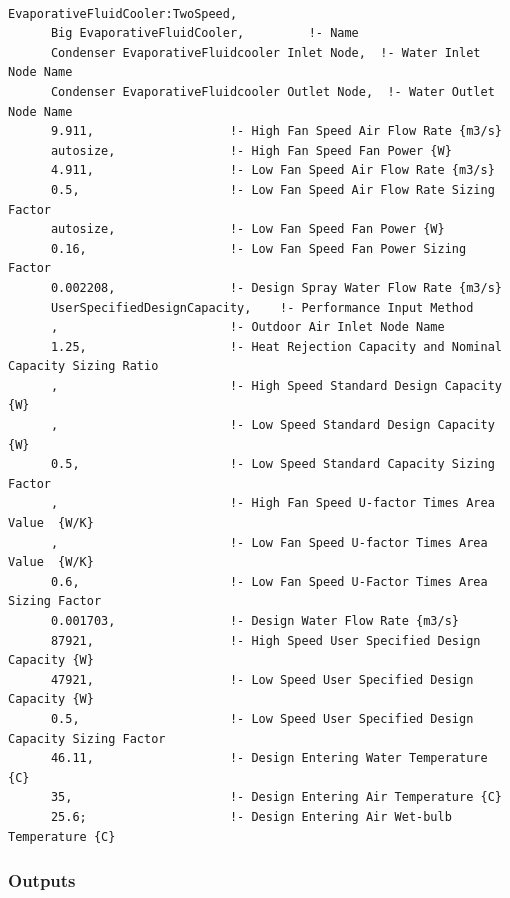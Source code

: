 \begin{lstlisting}

EvaporativeFluidCooler:TwoSpeed,
      Big EvaporativeFluidCooler,         !- Name
      Condenser EvaporativeFluidcooler Inlet Node,  !- Water Inlet Node Name
      Condenser EvaporativeFluidcooler Outlet Node,  !- Water Outlet Node Name
      9.911,                   !- High Fan Speed Air Flow Rate {m3/s}
      autosize,                !- High Fan Speed Fan Power {W}
      4.911,                   !- Low Fan Speed Air Flow Rate {m3/s}
      0.5,                     !- Low Fan Speed Air Flow Rate Sizing Factor
      autosize,                !- Low Fan Speed Fan Power {W}
      0.16,                    !- Low Fan Speed Fan Power Sizing Factor
      0.002208,                !- Design Spray Water Flow Rate {m3/s}
      UserSpecifiedDesignCapacity,    !- Performance Input Method
      ,                        !- Outdoor Air Inlet Node Name
      1.25,                    !- Heat Rejection Capacity and Nominal Capacity Sizing Ratio
      ,                        !- High Speed Standard Design Capacity {W}
      ,                        !- Low Speed Standard Design Capacity {W}
      0.5,                     !- Low Speed Standard Capacity Sizing Factor
      ,                        !- High Fan Speed U-factor Times Area Value  {W/K}
      ,                        !- Low Fan Speed U-factor Times Area Value  {W/K}
      0.6,                     !- Low Fan Speed U-Factor Times Area Sizing Factor
      0.001703,                !- Design Water Flow Rate {m3/s}
      87921,                   !- High Speed User Specified Design Capacity {W}
      47921,                   !- Low Speed User Specified Design Capacity {W}
      0.5,                     !- Low Speed User Specified Design Capacity Sizing Factor
      46.11,                   !- Design Entering Water Temperature {C}
      35,                      !- Design Entering Air Temperature {C}
      25.6;                    !- Design Entering Air Wet-bulb Temperature {C}
\end{lstlisting}

\subsubsection{Outputs}\label{outputs-7-001}

